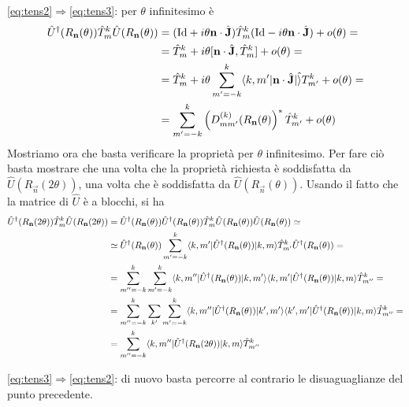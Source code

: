 \documentclass[a4paper, 11pt]{article}
\newcommand{\op}[1]{\hat{#1}}
\newcommand{\id}{\mathrm{Id}}
\renewcommand{\op}[1]{\hat{#1}}
\begin{document}
\ref{eq:tens2}$\Rightarrow$\ref{eq:tens3}: per $\theta$ infinitesimo è
\begin{align*}\op U^\dagger(R_\vec{n}(\theta))\op T^k_m\op U(R_\vec{n}(\theta))&=({\id}+i\theta\vec{n}\cdot\op{\vec{J}})\op T^k_m({\id}-i\theta\vec{n}\cdot\op{\vec{J}})+o(\theta)=\\&=\op T^k_m+i\theta[\vec{n}\cdot\op{\vec{J}},\op T^k_m]+o(\theta)=\\&=\op T^k_m+i\theta\sum_{m'=-k}^{k}\braketop{k,m'}{\vec{n}\cdot\op{\vec{J}}}\op T^k_{m'}+o(\theta)=\\&=\sum_{m'=-k}^{k}\left(D^{(k)}_{mm'}(R_\vec{n}(\theta)\right)^*\op T^k_{m'}+o(\theta)\end{align*}
Mostriamo ora che basta verificare la proprietà per $\theta$ infinitesimo. Per fare ciò basta mostrare che una volta che la proprietà richiesta è soddisfatta da $\op U(R_\vec{n}(2\theta))$, una volta che è soddisfatta da $\op U(R_\vec{n}(\theta))$. Usando il fatto che la matrice di $\op U$ è a blocchi, si ha
\begin{align*}
	\op{U}^\dagger(R_\vec{n}(2\theta))\op T^k_m\op U(R_\vec{n}(2\theta))&=\op U^\dagger(R_\vec{n}(\theta))\op U^\dagger(R_\vec{n}(\theta))\op T^k_m\op U(R_\vec{n}(\theta))\op U(R_\vec{n}(\theta))\simeq\\&\simeq\op U^\dagger(R_\vec{n}(\theta))\sum_{m'=-k}^k\braketop{k,m'}{\op U^\dagger(R_\vec{n}(\theta))}{k,m}\op T^k_{m'}\op U^\dagger(R_\vec{n}(\theta))=\\&=\sum_{m''=-k}^{k}\sum_{m'=-k}^{k}\braketop{k,m''}{\op U^\dagger(R_\vec{n}(\theta))}{k,m'}\braketop{k,m'}{\op U^\dagger(R_\vec{n}(\theta))}{k,m}\op T^k_{m''}=\\&=\sum_{m''=-k}^{k}\sum_{k'}\sum_{m'=-k}^{k}\braketop{k,m''}{\op U^\dagger(R_\vec{n}(\theta))}{k',m'}\braketop{k',m'}{\op U^\dagger(R_\vec{n}(\theta))}{k,m}\op T^k_{m''}=\\&=\sum_{m''=-k}^{k}\braketop{k,m''}{\op U^\dagger(R_\vec{n}(2\theta))}{k,m}\op T^k_{m''}
\end{align*}

\ref{eq:tens3}$\Rightarrow$\ref{eq:tens2}: di nuovo basta percorre al contrario le disuaguaglianze del punto precedente.
\end{document}
